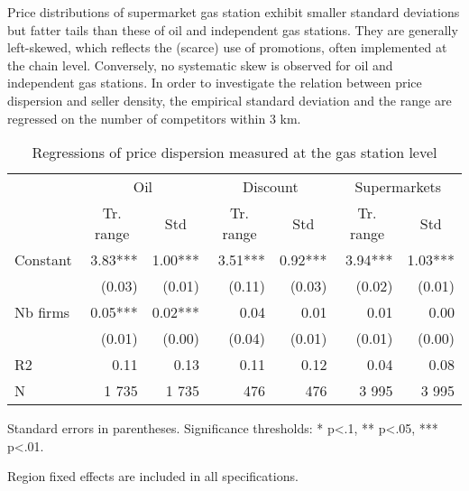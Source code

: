 \documentclass[english]{article}
\begin{document}
Price distributions of supermarket gas station exhibit smaller standard deviations but fatter tails than these of oil and independent gas stations. They are generally left-skewed, which reflects the (scarce) use of promotions, often implemented at the chain level. Conversely, no systematic skew is observed for oil and independent gas stations. In order to investigate the relation between price dispersion and seller density, the empirical standard deviation and the range are regressed on the number of competitors within 3 km.

\begin{table}[H]
\caption{Regressions of price dispersion measured at the gas station level}
\label{tab:station_price_support_regs}
\begin{threeparttable}
\begin{tabular}{lrrrrrr}
    \toprule
    \toprule
          & \multicolumn{2}{c}{Oil} & \multicolumn{2}{c}{Discount} & \multicolumn{2}{c}{Supermarkets} \\
          & \multicolumn{1}{c}{Tr. range} & \multicolumn{1}{c}{Std} & \multicolumn{1}{c}{Tr. range} & \multicolumn{1}{c}{Std} & \multicolumn{1}{c}{Tr. range} & \multicolumn{1}{c}{Std} \\
    \midrule
    Constant & 3.83*** & 1.00*** & 3.51*** & 0.92*** & 3.94*** & 1.03*** \\
          & (0.03) & (0.01) & (0.11) & (0.03) & (0.02) & (0.01) \\
    Nb firms & 0.05*** & 0.02*** & 0.04  & 0.01  & 0.01  & 0.00 \\
          & (0.01) & (0.00) & (0.04) & (0.01) & (0.01) & (0.00) \\
    \midrule
    R2    & 0.11  & 0.13  & 0.11  & 0.12  & 0.04  & 0.08 \\
    N     & 1 735 & 1 735 &  476  &  476  & 3 995 & 3 995 \\
    \bottomrule
    \bottomrule
\end{tabular}
\begin{tablenotes}
      \small
      \item Standard errors in parentheses. Significance thresholds: * p<.1, ** p<.05, *** p<.01.
      \item Region fixed effects are included in all specifications.
\end{tablenotes}
\end{threeparttable}
\end{table}
\end{document}
